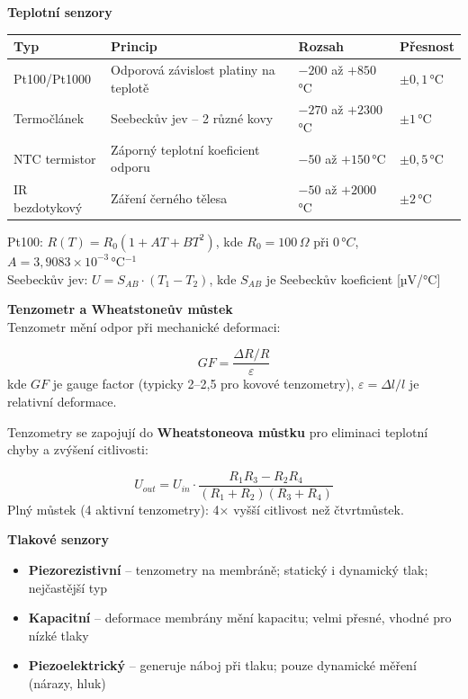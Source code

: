\documentclass[a4paper,10pt]{article}
\begin{document}
\begin{vysvetlenibox}
\textbf{Teplotní senzory}

\begin{center}
\begin{tabularx}{0.95\linewidth}{@{} l X l l @{}}
    \toprule
    \textbf{Typ} & \textbf{Princip} & \textbf{Rozsah} & \textbf{Přesnost} \\
    \midrule
    Pt100/Pt1000 & Odporová závislost platiny na teplotě & $-200$ až $+850$\,°C & $\pm0{,}1$\,°C \\
    Termočlánek & Seebeckův jev -- 2 různé kovy & $-270$ až $+2300$\,°C & $\pm1$\,°C \\
    NTC termistor & Záporný teplotní koeficient odporu & $-50$ až $+150$\,°C & $\pm0{,}5$\,°C \\
    IR bezdotykový & Záření černého tělesa & $-50$ až $+2000$\,°C & $\pm2$\,°C \\
    \bottomrule
\end{tabularx}
\end{center}

\begin{vzorcebox}
Pt100: $R(T) = R_0 \left(1 + AT + BT^2\right)$,
kde $R_0 = 100\,\Omega$ při $0\,°C$, $A = 3{,}9083\times10^{-3}$\,°C$^{-1}$\\
Seebeckův jev: $U = S_{AB} \cdot (T_1 - T_2)$,
kde $S_{AB}$ je Seebeckův koeficient [µV/°C]
\end{vzorcebox}

\textbf{Tenzometr a Wheatstoneův můstek}\\
Tenzometr mění odpor při mechanické deformaci:

\begin{vzorcebox}
$$GF = \frac{\Delta R / R}{\varepsilon}$$
kde $GF$ je gauge factor (typicky 2--2,5 pro kovové tenzometry),
$\varepsilon = \Delta l / l$ je relativní deformace.
\end{vzorcebox}

Tenzometry se zapojují do \textbf{Wheatstoneova můstku} pro eliminaci
teplotní chyby a zvýšení citlivosti:

\begin{vzorcebox}
$$U_{out} = U_{in} \cdot \frac{R_1 R_3 - R_2 R_4}{(R_1+R_2)(R_3+R_4)}$$
Plný můstek (4 aktivní tenzometry): 4× vyšší citlivost než čtvrtmůstek.
\end{vzorcebox}

\textbf{Tlakové senzory}
\begin{itemize}[noitemsep, leftmargin=1.4em, topsep=4pt]
    \item \textbf{Piezorezistivní} -- tenzometry na membráně;
          statický i dynamický tlak; nejčastější typ
    \item \textbf{Kapacitní} -- deformace membrány mění kapacitu;
          velmi přesné, vhodné pro nízké tlaky
    \item \textbf{Piezoelektrický} -- generuje náboj při tlaku;
          pouze dynamické měření (nárazy, hluk)
\end{itemize}
\end{vysvetlenibox}


\end{document}

